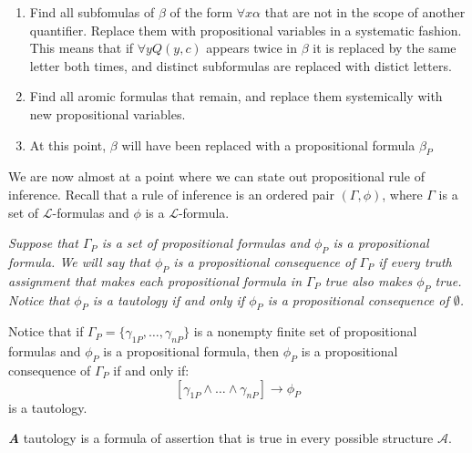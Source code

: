 \documentclass[10pt,a4paper]{article}
\newenvironment{callout}
	{\begin{calloutbox}\color{charcoal}\textbf\textit}
	{\end{calloutbox}}
\newcommand{\curveL}{\mathcal{L}}
\newcommand{\curveA}{\mathcal{A}}
\begin{document}
                            \begin{enumerate}
                                \item Find all subfomulas of $\beta$ of the form $\forall x\alpha$ that are not in the scope of another quantifier. Replace them with propositional variables in a systematic fashion. This means that if $\forall yQ(y,c)$ appears twice in $\beta$ it is replaced by the same letter both times, and distinct subformulas are replaced with distict letters.
                                \item Find all aromic formulas that remain, and replace them systemically with new propositional variables.
                                \item At this point, $\beta$ will have been replaced with a propositional formula $\beta_P$
                            \end{enumerate}
                            We are now almost at a point where we can state out propositional rule of inference. Recall that a rule of inference is an ordered pair $(\Gamma,\phi)$, where $\Gamma$ is a set of $\curveL$-formulas and $\phi$ is a $\curveL$-formula.
                            \begin{define}
                                \textit{Suppose that $\Gamma_P$ is a set of propositional formulas and $\phi_P$ is a propositional formula. We will say that $\phi_P$ is a propositional consequence of $\Gamma_P$ if every truth assignment that makes each propositional formula in $\Gamma_P$ true also makes $\phi_P$ true. Notice that $\phi_P$ is a tautology if and only if $\phi_P$ is a propositional consequence of $\emptyset$.}
                            \end{define}
                            Notice that if $\Gamma_P=\{\gamma_{1P},\dots,\gamma_{nP}\}$ is a nonempty finite set of propositional formulas and $\phi_P$ is a propositional formula, then $\phi_P$ is a propositional consequence of $\Gamma_P$ if and only if:
                            \begin{equation}
                                \left[
                                    \gamma_{1P}\land\dots\land \gamma_{nP} 
                                \right]\rightarrow \phi_P 
                            \end{equation}
                            is a tautology.
                            \begin{callout}
                                A tautology is a formula of assertion that is true in every possible structure $\curveA$.
                            \end{callout}
\end{document}
